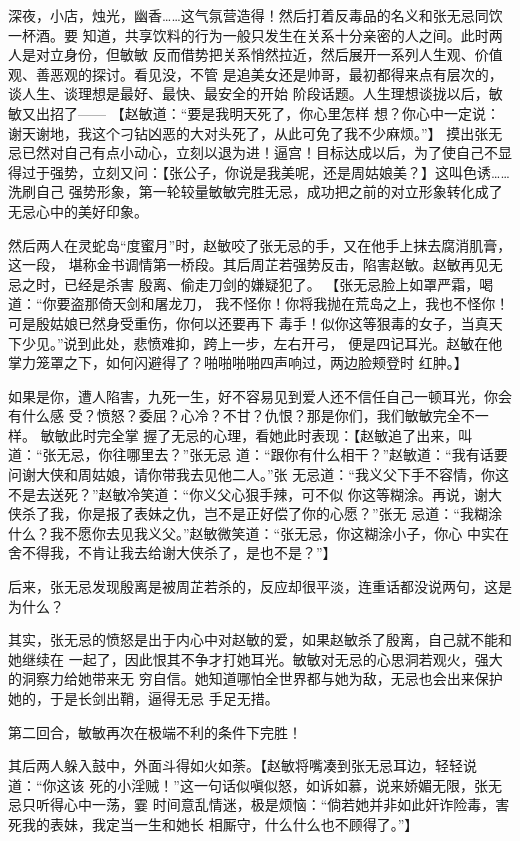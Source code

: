 \documentclass[11pt]{article}
\begin{document}
深夜，小店，烛光，幽香……这气氛营造得！然后打着反毒品的名义和张无忌同饮一杯酒。要
知道，共享饮料的行为一般只发生在关系十分亲密的人之间。此时两人是对立身份，但敏敏
反而借势把关系悄然拉近，然后展开一系列人生观、价值观、善恶观的探讨。看见没，不管
是追美女还是帅哥，最初都得来点有层次的，谈人生、谈理想是最好、最快、最安全的开始
阶段话题。人生理想谈拢以后，敏敏又出招了—— 【赵敏道：“要是我明天死了，你心里怎样
想？你心中一定说：谢天谢地，我这个刁钻凶恶的大对头死了，从此可免了我不少麻烦。”】
摸出张无忌已然对自己有点小动心，立刻以退为进！逼宫！目标达成以后，为了使自己不显
得过于强势，立刻又问：【张公子，你说是我美呢，还是周姑娘美？】这叫色诱……洗刷自己
强势形象，第一轮较量敏敏完胜无忌，成功把之前的对立形象转化成了无忌心中的美好印象。

 然后两人在灵蛇岛“度蜜月”时，赵敏咬了张无忌的手，又在他手上抹去腐消肌膏，这一段，
堪称金书调情第一桥段。其后周芷若强势反击，陷害赵敏。赵敏再见无忌之时，已经是杀害
殷离、偷走刀剑的嫌疑犯了。 【张无忌脸上如罩严霜，喝道：“你要盗那倚天剑和屠龙刀，
我不怪你！你将我抛在荒岛之上，我也不怪你！可是殷姑娘已然身受重伤，你何以还要再下
毒手！似你这等狠毒的女子，当真天下少见。”说到此处，悲愤难抑，跨上一步，左右开弓，
便是四记耳光。赵敏在他掌力笼罩之下，如何闪避得了？啪啪啪啪四声响过，两边脸颊登时
红肿。】


如果是你，遭人陷害，九死一生，好不容易见到爱人还不信任自己一顿耳光，你会有什么感
受？愤怒？委屈？心冷？不甘？仇恨？那是你们，我们敏敏完全不一样。 敏敏此时完全掌
握了无忌的心理，看她此时表现：【赵敏追了出来，叫道：“张无忌，你往哪里去？”张无忌
道：“跟你有什么相干？”赵敏道：“我有话要问谢大侠和周姑娘，请你带我去见他二人。”张
无忌道：“我义父下手不容情，你这不是去送死？”赵敏冷笑道：“你义父心狠手辣，可不似
你这等糊涂。再说，谢大侠杀了我，你是报了表妹之仇，岂不是正好偿了你的心愿？”张无
忌道：“我糊涂什么？我不愿你去见我义父。”赵敏微笑道：“张无忌，你这糊涂小子，你心
中实在舍不得我，不肯让我去给谢大侠杀了，是也不是？”】

后来，张无忌发现殷离是被周芷若杀的，反应却很平淡，连重话都没说两句，这是为什么？

其实，张无忌的愤怒是出于内心中对赵敏的爱，如果赵敏杀了殷离，自己就不能和她继续在
一起了，因此恨其不争才打她耳光。敏敏对无忌的心思洞若观火，强大的洞察力给她带来无
穷自信。她知道哪怕全世界都与她为敌，无忌也会出来保护她的，于是长剑出鞘，逼得无忌
手足无措。

第二回合，敏敏再次在极端不利的条件下完胜！

 其后两人躲入鼓中，外面斗得如火如荼。【赵敏将嘴凑到张无忌耳边，轻轻说道：“你这该
死的小淫贼！”这一句话似嗔似怒，如诉如慕，说来娇媚无限，张无忌只听得心中一荡，霎
时间意乱情迷，极是烦恼：“倘若她并非如此奸诈险毒，害死我的表妹，我定当一生和她长
相厮守，什么什么也不顾得了。”】
\end{document}
